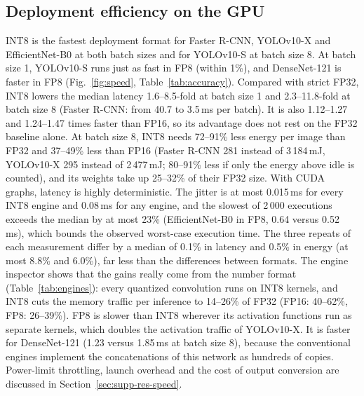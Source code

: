 \documentclass[pdflatex,sn-mathphys-num]{sn-jnl}%
\theoremstyle{thmstyleone}%
\theoremstyle{thmstyletwo}%
\theoremstyle{thmstylethree}%
\begin{document}
\subsection{Deployment efficiency on the GPU}\label{sec:res-speed}
INT8 is the fastest deployment format for Faster R-CNN, YOLOv10-X and EfficientNet-B0 at both batch sizes and for YOLOv10-S at batch size 8. At batch size 1, YOLOv10-S runs just as fast in FP8 (within 1\%), and DenseNet-121 is faster in FP8 (Fig.~\ref{fig:speed}, Table~\ref{tab:accuracy}). Compared with strict FP32, INT8 lowers the median latency 1.6--8.5-fold at batch size 1 and 2.3--11.8-fold at batch size 8 (Faster R-CNN: from 40.7 to 3.5\,ms per batch). It is also 1.12--1.27 and 1.24--1.47 times faster than FP16, so its advantage does not rest on the FP32 baseline alone. At batch size 8, INT8 needs 72--91\% less energy per image than FP32 and 37--49\% less than FP16 (Faster R-CNN 281 instead of 3\,184\,mJ, YOLOv10-X 295 instead of 2\,477\,mJ; 80--91\% less if only the energy above idle is counted), and its weights take up 25--32\% of their FP32 size. With CUDA graphs, latency is highly deterministic. The jitter is at most 0.015\,ms for every INT8 engine and 0.08\,ms for any engine, and the slowest of 2\,000 executions exceeds the median by at most 23\% (EfficientNet-B0 in FP8, 0.64 versus 0.52\,ms), which bounds the observed worst-case execution time. The three repeats of each measurement differ by a median of 0.1\% in latency and 0.5\% in energy (at most 8.8\% and 6.0\%), far less than the differences between formats. The engine inspector shows that the gains really come from the number format (Table~\ref{tab:engines}): every quantized convolution runs on INT8 kernels, and INT8 cuts the memory traffic per inference to 14--26\% of FP32 (FP16: 40--62\%, FP8: 26--39\%). FP8 is slower than INT8 wherever its activation functions run as separate kernels, which doubles the activation traffic of YOLOv10-X. It is faster for DenseNet-121 (1.23 versus 1.85\,ms at batch size 8), because the conventional engines implement the concatenations of this network as hundreds of copies. Power-limit throttling, launch overhead and the cost of output conversion are discussed in Section~\ref{sec:supp-res-speed}.

\end{document}
